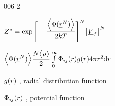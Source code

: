 \begin{mitframe}{006-2}

    
    \begin{listone}
    
    \item $\configint = \exp\Bigg[-\dfrac{\Big\langle\pot(\uline{\pos}^{\nummoles})\Big\rangle}{2\thermcond\Temp}\Bigg]^N\big[\uline{\vol}_{\fug}\big]^{\nummoles}$
    
    	\begin{listtwo}
    
    	\item $\Big\langle\pot(\uline{\pos}^{\nummoles})\Big\rangle \dfrac{\nummoles\big\langle\dens\big\rangle}{2}\int\limits_{0}^{\infty}\potfunc\raddist4\pie\pos^2\mathrm{d}\pos $

			\begin{listthree}

    		\item $\raddist$ , radial distribution function 
    		\item $\potfunc$ , potential function
    	
        	\end{listthree}
    
    	\end{listtwo}
    
    \end{listone}
    
\end{mitframe}